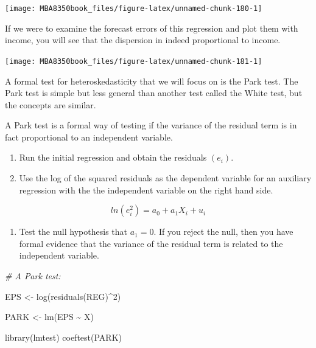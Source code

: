 \documentclass[
]{book}
\newenvironment{Shaded}{\begin{snugshade}}{\end{snugshade}}
\newcommand{\CommentTok}[1]{\textcolor[rgb]{0.56,0.35,0.01}{\textit{#1}}}
\newcommand{\DecValTok}[1]{\textcolor[rgb]{0.00,0.00,0.81}{#1}}
\newcommand{\FunctionTok}[1]{\textcolor[rgb]{0.00,0.00,0.00}{#1}}
\newcommand{\NormalTok}[1]{#1}
\newcommand{\OtherTok}[1]{\textcolor[rgb]{0.56,0.35,0.01}{#1}}
\newcommand{\SpecialCharTok}[1]{\textcolor[rgb]{0.00,0.00,0.00}{#1}}
\providecommand{\tightlist}{%
  \setlength{\itemsep}{0pt}\setlength{\parskip}{0pt}}
\begin{document}
\begin{center}\texttt{[image: MBA8350book\_files/figure-latex/unnamed-chunk-180-1]} \end{center}

If we were to examine the forecast errors of this regression and plot them with income, you will see that the dispersion in indeed proportional to income.

\begin{center}\texttt{[image: MBA8350book\_files/figure-latex/unnamed-chunk-181-1]} \end{center}

A formal test for heteroskedasticity that we will focus on is the Park test. The Park test is simple but less general than another test called the White test, but the concepts are similar.

A Park test is a formal way of testing if the variance of the residual term is in fact proportional to an independent variable.

\begin{enumerate}
\def\labelenumi{\arabic{enumi}.}
\item
  Run the initial regression and obtain the residuals \((e_i)\).
\item
  Use the log of the squared residuals as the dependent variable for an auxiliary regression with the the independent variable on the right hand side.
\end{enumerate}

\[ ln( e_i^2) = a_0 + a_1 X_i + u_i\]

\begin{enumerate}
\def\labelenumi{\arabic{enumi}.}
\setcounter{enumi}{2}
\tightlist
\item
  Test the null hypothesis that \(a_1 = 0\). If you reject the null, then you have formal evidence that the variance of the residual term is related to the independent variable.
\end{enumerate}

\begin{Shaded}
\begin{Highlighting}[]
\CommentTok{\# A Park test:}

\NormalTok{EPS }\OtherTok{\textless{}{-}} \FunctionTok{log}\NormalTok{(}\FunctionTok{residuals}\NormalTok{(REG)}\SpecialCharTok{\^{}}\DecValTok{2}\NormalTok{)}

\NormalTok{PARK }\OtherTok{\textless{}{-}} \FunctionTok{lm}\NormalTok{(EPS }\SpecialCharTok{\textasciitilde{}}\NormalTok{ X)}

\FunctionTok{library}\NormalTok{(lmtest)}
\FunctionTok{coeftest}\NormalTok{(PARK)}
\end{Highlighting}
\end{Shaded}
\end{document}
